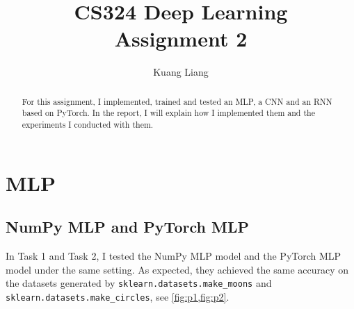 \documentclass[12pt]{article}
\begin{document}
 
 
\title{CS324 Deep Learning\\ \textbf{Assignment 2}}
\author{Kuang Liang}

\maketitle

\begin{abstract}

For this assignment, I implemented, trained and tested an MLP, a CNN and an RNN based on PyTorch. In the report, I will explain how I implemented them and the experiments I conducted with them.

\end{abstract}

\section{MLP}

\subsection{NumPy MLP and PyTorch MLP}

In Task 1 and Task 2, I tested the NumPy MLP model and the PyTorch MLP model under the same setting. As expected, they achieved the same accuracy on the datasets generated by \texttt{sklearn.datasets.make\_moons} and \texttt{sklearn.datasets.make\_circles}, see \cref{fig:p1,fig:p2}.
\end{document}

